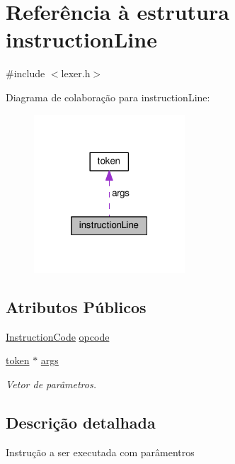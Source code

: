 \hypertarget{structinstruction_line}{\section{Referência à estrutura instruction\-Line}
\label{structinstruction_line}
}


{\ttfamily \#include $<$lexer.\-h$>$}



Diagrama de colaboração para instruction\-Line\-:\nopagebreak
\begin{figure}[H]
\begin{center}
\leavevmode
\includegraphics[width=160pt]{structinstruction_line__coll__graph}
\end{center}
\end{figure}
\subsection*{Atributos Públicos}
\begin{DoxyCompactItemize}
\item 
\hyperlink{languagedefinition_8h_a1830ff5737e4f1610e975ee2aa489206}{Instruction\-Code} \hyperlink{structinstruction_line_a309feca274873683d12f90cf0bd81780}{opcode}
\item 
\hyperlink{structtoken}{token} $\ast$ \hyperlink{structinstruction_line_ab6b4be43f89da78d09a9469f952435c7}{args}
\begin{DoxyCompactList}\small\item\em Vetor de parâmetros. \end{DoxyCompactList}\end{DoxyCompactItemize}


\subsection{Descrição detalhada}
Instrução a ser executada com parâmentros 

